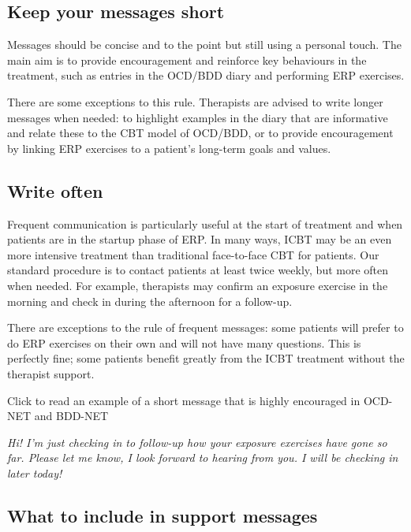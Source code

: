 \documentclass[]{book}
\begin{document}
\hypertarget{keep-your-messages-short}{%
\subsection{Keep your messages short}\label{keep-your-messages-short}}

Messages should be concise and to the point but still using a personal touch. The main aim is to provide encouragement and reinforce key behaviours in the treatment, such as entries in the OCD/BDD diary and performing ERP exercises.

There are some exceptions to this rule. Therapists are advised to write longer messages when needed: to highlight examples in the diary that are informative and relate these to the CBT model of OCD/BDD, or to provide encouragement by linking ERP exercises to a patient's long-term goals and values.

\hypertarget{write-often}{%
\subsection{Write often}\label{write-often}}

Frequent communication is particularly useful at the start of treatment and when patients are in the startup phase of ERP. In many ways, ICBT may be an even more intensive treatment than traditional face-to-face CBT for patients. Our standard procedure is to contact patients at least twice weekly, but more often when needed. For example, therapists may confirm an exposure exercise in the morning and check in during the afternoon for a follow-up.

There are exceptions to the rule of frequent messages: some patients will prefer to do ERP exercises on their own and will not have many questions. This is perfectly fine; some patients benefit greatly from the ICBT treatment without the therapist support.

Click to read an example of a short message that is highly encouraged in OCD-NET and BDD-NET

\emph{Hi! I'm just checking in to follow-up how your exposure exercises have gone so far. Please let me know, I look forward to hearing from you. I will be checking in later today!}

\hypertarget{what-to-include-in-support-messages}{%
\subsection{What to include in support messages}\label{what-to-include-in-support-messages}}
\end{document}
